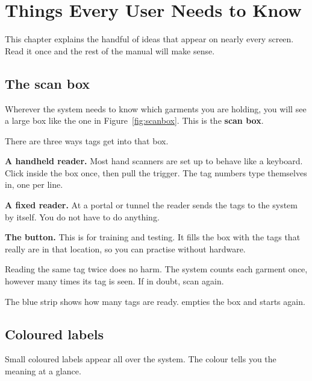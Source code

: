 \chapter{Things Every User Needs to Know}

This chapter explains the handful of ideas that appear on nearly every screen.
Read it once and the rest of the manual will make sense.

\section{The scan box}

Wherever the system needs to know which garments you are holding, you will see a
large box like the one in Figure~\ref{fig:scanbox}. This is the \textbf{scan box}.


There are three ways tags get into that box.

\begin{steps}
  \item \textbf{A handheld reader.} Most hand scanners are set up to behave like
        a keyboard. Click inside the box once, then pull the trigger. The tag
        numbers type themselves in, one per line.
  \item \textbf{A fixed reader.} At a portal or tunnel the reader sends the tags
        to the system by itself. You do not have to do anything.
  \item \textbf{The  button.} This is for training and
        testing. It fills the box with the tags that really are in that location,
        so you can practise without hardware.
\end{steps}

\begin{tipbox}
Reading the same tag twice does no harm. The system counts each garment once,
however many times its tag is seen. If in doubt, scan again.
\end{tipbox}

The blue strip shows how many tags are ready.  empties the box and
starts again.

\section{Coloured labels}

Small coloured labels appear all over the system. The colour tells you the
meaning at a glance.

